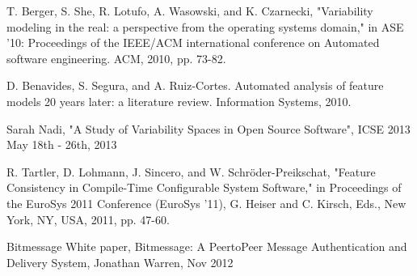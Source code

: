 \documentclass{acm_proc_article-sp}
\begin{document}
\begin{thebibliography}{1}

T. Berger, S. She, R. Lotufo, A. Wasowski, and K. Czarnecki, "Variability modeling in the real: a perspective from the operating systems domain," in ASE '10: Proceedings of the IEEE/ACM international conference on Automated software engineering. ACM, 2010, pp. 73-82.

D. Benavides, S. Segura, and A. Ruiz-Cortes. Automated analysis of feature models 20 years later: a literature review. Information Systems, 2010.

Sarah Nadi, "A Study of Variability Spaces in Open Source Software", ICSE 2013 May 18th - 26th, 2013

R. Tartler, D. Lohmann, J. Sincero, and W. Schröder-Preikschat, "Feature Consistency in Compile-Time Configurable System Software," in Proceedings of the EuroSys 2011 Conference (EuroSys '11), G. Heiser and C. Kirsch, Eds., New York, NY, USA, 2011, pp. 47-60.

Bitmessage White paper, Bitmessage: A PeertoPeer Message Authentication and Delivery
System, Jonathan Warren, Nov 2012





\end{thebibliography}

%
%
\end{document}

